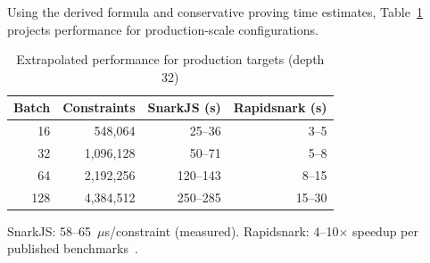Using the derived formula and conservative proving time estimates,
Table~\ref{tab:extrapolation} projects performance for production-scale
configurations.

\begin{table}[htbp]
\centering
\caption{Extrapolated performance for production targets (depth 32)}
\label{tab:extrapolation}
\begin{tabular}{@{}rrrr@{}}
\toprule
Batch & Constraints & SnarkJS (s) & Rapidsnark (s) \\
\midrule
 16 &    548,064 & 25--36 &  3--5 \\
 32 &  1,096,128 & 50--71 &  5--8 \\
 64 &  2,192,256 & 120--143 &  8--15 \\
128 &  4,384,512 & 250--285 & 15--30 \\
\bottomrule
\end{tabular}
\par\vspace{1mm}
\parbox{\columnwidth}{\footnotesize SnarkJS: 58--65~$\mu$s/constraint (measured). Rapidsnark:
4--10$\times$ speedup per published benchmarks~\cite{tachyon2024,zkmopro2024}.}
\end{table}
\FloatBarrier
